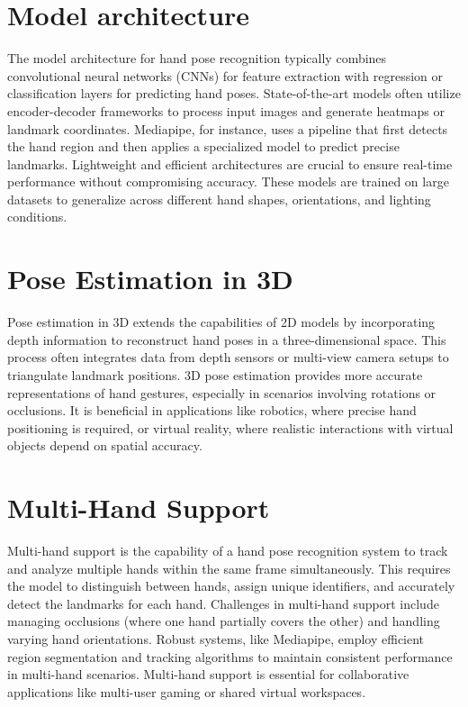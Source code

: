 \section{Model architecture}
The model architecture for hand pose recognition typically combines convolutional neural networks (CNNs) for feature extraction with regression or classification layers for predicting hand poses. State-of-the-art models often utilize encoder-decoder frameworks to process input images and generate heatmaps or landmark coordinates. Mediapipe, for instance, uses a pipeline that first detects the hand region and then applies a specialized model to predict precise landmarks. Lightweight and efficient architectures are crucial to ensure real-time performance without compromising accuracy. These models are trained on large datasets to generalize across different hand shapes, orientations, and lighting conditions.

\section{Pose Estimation in 3D}
Pose estimation in 3D extends the capabilities of 2D models by incorporating depth information to reconstruct hand poses in a three-dimensional space. This process often integrates data from depth sensors or multi-view camera setups to triangulate landmark positions. 3D pose estimation provides more accurate representations of hand gestures, especially in scenarios involving rotations or occlusions. It is beneficial in applications like robotics, where precise hand positioning is required, or virtual reality, where realistic interactions with virtual objects depend on spatial accuracy.

\section{Multi-Hand Support}
Multi-hand support is the capability of a hand pose recognition system to track and analyze multiple hands within the same frame simultaneously. This requires the model to distinguish between hands, assign unique identifiers, and accurately detect the landmarks for each hand. Challenges in multi-hand support include managing occlusions (where one hand partially covers the other) and handling varying hand orientations. Robust systems, like Mediapipe, employ efficient region segmentation and tracking algorithms to maintain consistent performance in multi-hand scenarios. Multi-hand support is essential for collaborative applications like multi-user gaming or shared virtual workspaces.